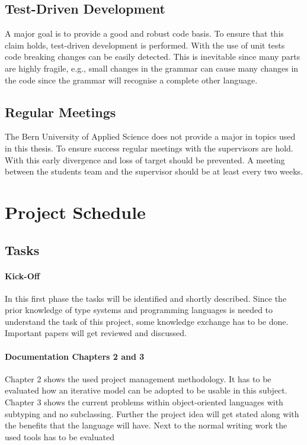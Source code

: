 \subsection{Test-Driven Development}
A major goal is to provide a good and robust code basis. To ensure that
this claim holds, test-driven development is performed. With the use of
unit tests code breaking changes can be easily detected. This is inevitable
since many parts are highly fragile, e.g., small changes in the grammar can
cause many changes in the code since the grammar will recognise a complete
other language.

\subsection{Regular Meetings}
The Bern University of Applied Science does not provide a major in
topics used in this thesis. To ensure success regular meetings with the
supervisors are hold. With this early divergence and loss of target should
be prevented. A meeting between the students team and the supervisor
should be at least every two weeks.

\section{Project Schedule}
\subsection{Tasks}
\paragraph{Kick-Off}
In this first phase the tasks will be identified and shortly
described. Since the prior knowledge of type systems and programming
languages is needed to understand the task of this project, some
knowledge exchange has to be done. Important papers will get reviewed
and discussed.

\paragraph{Documentation Chapters 2 and 3}
Chapter 2 shows the used project management methodology. It has to be
evaluated how an iterative model can be adopted to be usable in this
subject. Chapter 3 shows the current problems within object-oriented
languages with subtyping and no subclassing. Further the project idea
will get stated along with the benefits that the language will have. Next
to the normal writing work the used tools has to be evaluated

